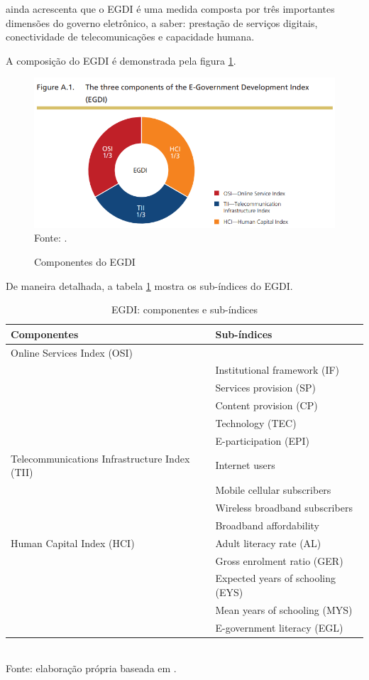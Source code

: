 \cite{ONU_EGDI_description} ainda acrescenta que o EGDI é uma medida composta por três importantes dimensões do governo eletrônico, a saber: prestação de serviços digitais, conectividade de telecomunicações e capacidade humana. 

A composição do EGDI é demonstrada pela figura \ref{fig:egdi_componentes}.

\begin{figure}[H]
    \centering
    \caption{Componentes do EGDI}
    \includegraphics[width=1\linewidth]{figuras/egdi_componentes.png}
    \label{fig:egdi_componentes}
    \footnotesize{Fonte: \cite{ONU_EGDI_description}.}
\end{figure}

De maneira detalhada, a tabela \ref{tab:egdi_componentes_subindices} mostra os sub-índices do EGDI.

\begin{table}[H]
	\centering
	\caption{EGDI: componentes e sub-índices}
	\label{tab:egdi_componentes_subindices}
	\begin{tabular}{|p{5.5cm}|l|}
		\hline
		\textbf{Componentes} & \textbf{Sub-índices} \\
		\hline
		Online Services Index (OSI) & \\
		& Institutional framework (IF) \\ 
		& Services provision (SP) \\
		& Content provision (CP) \\
		& Technology (TEC) \\
		& E-participation (EPI) \\
		\hline
		Telecommunications Infrastructure Index (TII) & Internet users \\
		& Mobile cellular subscribers \\
		& Wireless broadband subscribers \\
		& Broadband affordability \\
		\hline
		Human Capital Index (HCI) & Adult literacy rate (AL) \\
		& Gross enrolment ratio (GER) \\
		& Expected years of schooling (EYS) \\
		& Mean years of schooling (MYS) \\
		& E-government literacy (EGL) \\
		\hline
	\end{tabular}
	\\ \footnotesize{Fonte: elaboração própria baseada em \cite{onu_egov_survey_2024}.}
\end{table}

